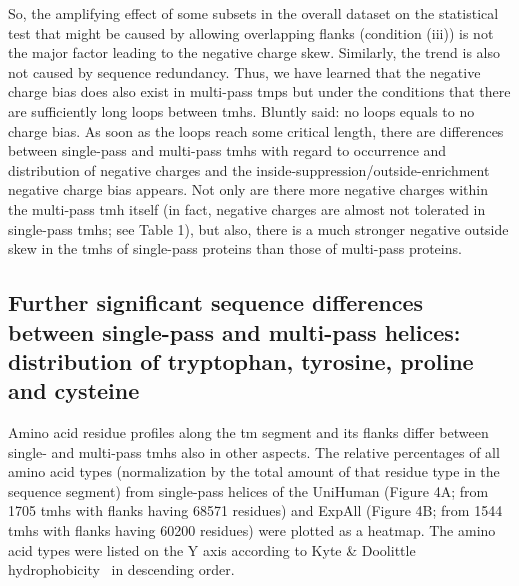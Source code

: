 So, the amplifying effect of some subsets in the overall dataset on the statistical test that might be caused by allowing overlapping flanks (condition (iii)) is not the major factor leading to the negative charge skew. Similarly, the trend is also not caused by sequence redundancy. Thus, we have learned that the negative charge bias does also exist in multi-pass \gls{tmp}s but under the conditions that there are sufficiently long loops between \gls{tmh}s. Bluntly said: no loops equals to no charge bias. As soon as the loops reach some critical length, there are differences between single-pass and multi-pass \gls{tmh}s with regard to occurrence and distribution of negative charges and the inside-suppression/outside-enrichment negative charge bias appears. Not only are there more negative charges within the multi-pass \gls{tmh} itself (in fact, negative charges are almost not tolerated in single-pass \gls{tmh}s; see Table 1), but also, there is a much stronger negative outside skew in the \gls{tmh}s of single-pass proteins than those of multi-pass proteins.

\subsection{Further significant sequence differences between single-pass and multi-pass helices: distribution of tryptophan, tyrosine, proline and cysteine}

Amino acid residue profiles along the \gls{tm} segment and its flanks differ between single- and multi-pass \gls{tmh}s also in other aspects. The relative percentages of all amino acid types (normalization by the total amount of that residue type in the sequence segment) from single-pass helices of the UniHuman (Figure 4A\@; from 1705 \gls{tmh}s with flanks having 68571 residues) and ExpAll (Figure 4B\@; from 1544 \gls{tmh}s with flanks having 60200 residues) were plotted as a heatmap. The amino acid types were listed on the Y axis according to Kyte \& Doolittle hydrophobicity~\cite{Kyte1982} in descending order.

